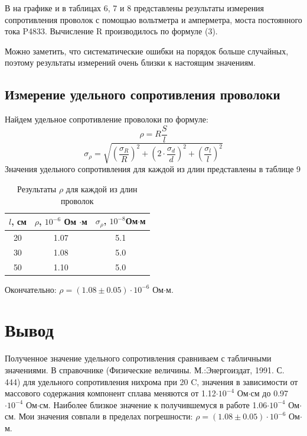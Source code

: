\documentclass[a4paper,12pt]{article}
\begin{document}
В на графике и в таблицах 6, 7 и 8 представлены результаты измерения сопротивления проволок с помощью вольтметра и амперметра, моста постоянного тока P4833. Вычисление R производилось по формуле (3).

Можно заметить, что систематические ошибки на порядок больше случайных, поэтому  результаты измерений очень близки к настоящим значениям.

\subsection{Измерение удельного сопротивления проволоки}

Найдем удельное сопротивление проволоки по формуле:
\begin{equation}
\rho = R\frac{S}{l}
\end{equation}
\begin{equation}
\sigma_{\rho} = \sqrt{\left( \frac{\sigma_R}{R} \right)^2+\left( 2 \cdot \frac{\sigma_d}{d} \right)^2+\left(\frac{\sigma_l}{l} \right)^2}
\end{equation}
Значения удельного сопротивления для каждой из длин представлены в таблице 9

\begin{table}[H]
\centering
\caption{Результаты $\rho$ для каждой из длин проволок}
\begin{tabular}{|c|c|c|}
\hline
$l$, см & $\rho$, $10^{-6}$ Ом $\cdot$м &$\sigma_{\rho}$, $10^{-8}$Ом$\cdot$м \\
\hline
20 & 1.07 & 5.1 \\
\hline
30 & 1.08 & 5.0 \\
\hline
50 & 1.10 & 5.0 \\
\hline
\end{tabular}
\end{table}

Окончательно: $\rho = (1.08 \pm 0.05)\cdot 10^{-6}$ Ом$\cdot$м.

\section{Вывод}
Полученное значение удельного сопротивления сравниваем с табличными значениями. В справочнике (Физические величины. М.:Энергоиздат, 1991. С. 444) для удельного сопротивления нихрома при 20 \textdegree C, значения в зависимости от массового содержания компонент сплава меняются от 1.12$\cdot10^{-4}$ Ом$\cdot$см до 0.97$\cdot10^{-4}$ Ом$\cdot$см. Наиболее близкое значение к получившемуся в работе 1.06$\cdot10^{-4}$ Ом$\cdot$см.
Мои значения совпали в пределах погрешности: $\rho = (1.08 \pm 0.05)\cdot 10^{-6}$ Ом$\cdot$м.
\end{document}
